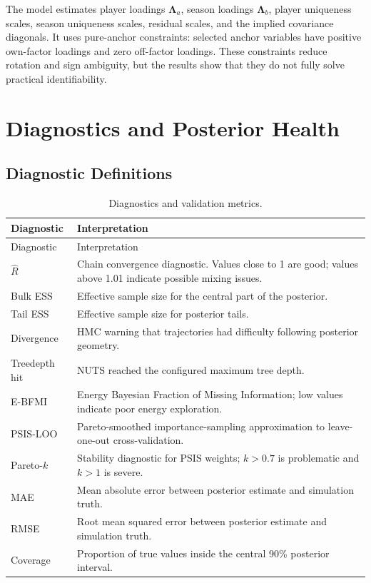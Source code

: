 \documentclass[11pt]{article}
\begin{document}
The model estimates player loadings \(\boldsymbol{\Lambda}_a\), season loadings
\(\boldsymbol{\Lambda}_b\), player uniqueness scales, season uniqueness scales,
residual scales, and the implied covariance diagonals. It uses pure-anchor
constraints: selected anchor variables have positive own-factor loadings and
zero off-factor loadings. These constraints reduce rotation and sign ambiguity,
but the results show that they do not fully solve practical identifiability.

\section{Diagnostics and Posterior Health}

\subsection{Diagnostic Definitions}

\begin{longtable}{L{0.23\textwidth}L{0.67\textwidth}}
\caption{Diagnostics and validation metrics.}
\label{tab:diagnostics-definitions}\\
\toprule
Diagnostic & Interpretation \\
\midrule
\endfirsthead
\toprule
Diagnostic & Interpretation \\
\midrule
\endhead
\bottomrule
\endfoot
\(\widehat{R}\) & Chain convergence diagnostic. Values close to 1 are good; values above 1.01 indicate possible mixing issues. \\
Bulk ESS & Effective sample size for the central part of the posterior. \\
Tail ESS & Effective sample size for posterior tails. \\
Divergence & HMC warning that trajectories had difficulty following posterior geometry. \\
Treedepth hit & NUTS reached the configured maximum tree depth. \\
E-BFMI & Energy Bayesian Fraction of Missing Information; low values indicate poor energy exploration. \\
PSIS-LOO & Pareto-smoothed importance-sampling approximation to leave-one-out cross-validation. \\
Pareto-\(k\) & Stability diagnostic for PSIS weights; \(k>0.7\) is problematic and \(k>1\) is severe. \\
MAE & Mean absolute error between posterior estimate and simulation truth. \\
RMSE & Root mean squared error between posterior estimate and simulation truth. \\
Coverage & Proportion of true values inside the central 90\% posterior interval. \\
\end{longtable}
\end{document}
